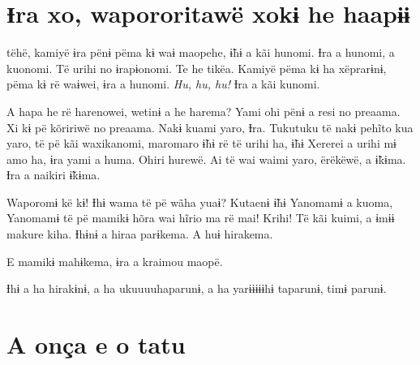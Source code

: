 

\chapter[Ɨra xo, wapororitawë xo kɨ he haapɨɨ]{Ɨra xo, wapororitawë xo\break kɨ he haapɨɨ}

 tëhë, kamiyë ɨra pënɨ pëma kɨ waɨ maopehe, ɨ̃hɨ a kãi hunomi. Ɨra a
hunomi, a kuonomi. Të urihi no ɨrapɨonomi. Te he tikëa. Kamiyë pëma kɨ
ha xëprarɨnɨ, pëma kɨ rë waɨwei, ɨra a hunomi. \textit{Hu, hu, hu!} Ɨra a kãi
kunomi. 

A hapa he rë harenowei, wetinɨ a he harema? Yami ohi pënɨ a resi no
preaama. Xi kɨ pë kõririwë no preaama. Nakɨ kuami yaro, Ɨra. Tukutuku të
nakɨ pehĩto kua yaro, të pë kãi waxikanomi, maromaro ɨ̃hɨ rë të urihi ha,
ɨ̃hɨ Xererei a urihi mɨ amo ha, ɨra yami a huma. Ohiri hurewë. Ai të wai
waimi yaro, ërëkëwë, a ɨ̃kɨma. Ɨra a naikiri ɨ̃kɨma. 


Waporomɨ kë kɨ! Ɨhɨ wama të pë wãha yuaɨ? Kutaenɨ ɨ̃hɨ Yanomamɨ a kuoma,
Yanomamɨ të pë mamikɨ hõra wai hĩrio ma rë mai! Krihi! Të kãi kuimi, a
ɨmɨɨ makure kiha. Ɨhɨnɨ a hiraa parɨkema. A huɨ hirakema. 

E mamikɨ mahɨkema, ɨra a kraimou maopë. 

Ɨhɨ a ha hirakɨnɨ, a ha ukuuuuhaparunɨ, a ha yarɨɨɨɨɨhɨ taparunɨ, timɨ
parunɨ. 

\chapter{A onça e o tatu}
 
  

